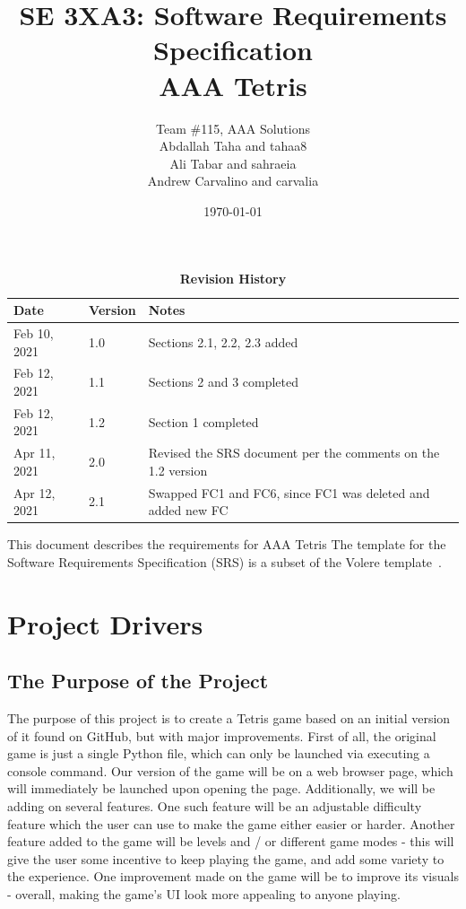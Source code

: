 \documentclass[12pt, titlepage]{article}
\title{SE 3XA3: Software Requirements Specification\\AAA Tetris}
\author{Team \#115, AAA Solutions
		\\ Abdallah Taha and tahaa8
		\\ Ali Tabar and sahraeia
		\\ Andrew Carvalino and carvalia
}
\date{\today}
\begin{document}
\maketitle

\tableofcontents
\listoftables
\listoffigures

\begin{table}[bp]
\caption{\bf Revision History}
\begin{tabularx}{\textwidth}{p{3cm}p{2cm}X}
\toprule {\bf Date} & {\bf Version} & {\bf Notes}\\
\midrule
Feb 10, 2021 & 1.0 & Sections 2.1, 2.2, 2.3 added\\
Feb 12, 2021 & 1.1 & Sections 2 and 3 completed\\
Feb 12, 2021 & 1.2 & Section 1 completed\\
Apr 11, 2021 & 2.0 & Revised the SRS document per the comments on the 1.2 version\\
Apr 12, 2021 & 2.1 & Swapped FC1 and FC6, since FC1 was deleted and added new FC \\
\bottomrule
\end{tabularx}
\end{table}

\newpage


This document describes the requirements for AAA Tetris The template for the Software
Requirements Specification (SRS) is a subset of the Volere
template~\citep{RobertsonAndRobertson2012}.

\section{Project Drivers}

\subsection{The Purpose of the Project}
The purpose of this project is to create a Tetris game based on an initial version of it found on GitHub, but with major improvements. First of all, the original game is just a single Python file, which can only be launched via executing a console command. Our version of the game will be on a web browser page, which will immediately be launched upon opening the page. Additionally, we will be adding on several features. One such feature will be an adjustable difficulty feature which the user can use to make the game either easier or harder. Another feature added to the game will be levels and / or different game modes - this will give the user some incentive to keep playing the game, and add some variety to the experience. 
One improvement made on the game will be to improve its visuals - overall, making the game’s UI look more appealing to anyone playing.
\end{document}
